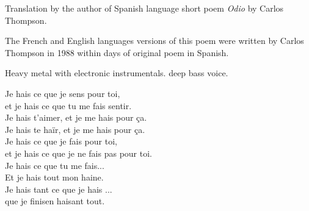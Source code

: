 \label{sec:je-hais}

\begin{notes}
Translation by the author of Spanish language short poem \emph{Odio} by Carlos Thompson.

The French and English languages versions of this poem were written by Carlos Thompson in 1988 within days of original poem in Spanish.
\end{notes}

\begin{style}
Heavy metal with electronic instrumentals. %
deep bass voice.
\end{style}
\begin{lyrics}
Je hais ce que je sens pour toi,\\
et je hais ce que tu me fais sentir.\\
Je hais t'aimer, et je me hais pour ça.\\
Je hais te haïr, et je me hais pour ça.\\
Je hais ce que je fais pour toi,\\
et je hais ce que je ne fais pas pour toi.\\
Je hais ce que tu me fais...\\
Et je hais tout mon haine.\\
Je hais tant ce que je hais ...\\
que je finisen haisant tout.
\end{lyrics}

